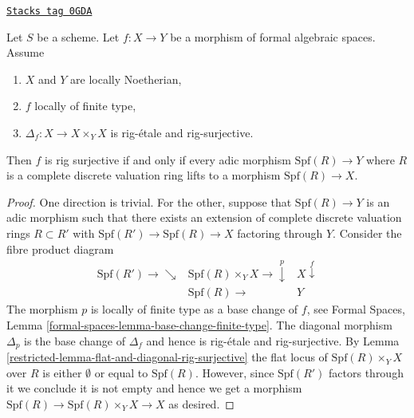 \begin{lemma}
\label{restricted-lemma-rig-monomorphism-rig-surjective}
\href{https://stacks.math.columbia.edu/tag/0GDA}{\texttt{Stacks tag 0GDA}}

Let $S$ be a scheme. Let $f : X \to Y$ be a morphism of formal algebraic
spaces. Assume
\begin{enumerate}
\item $X$ and $Y$ are locally Noetherian,
\item $f$ locally of finite type,
\item $\Delta_f : X \to X \times_Y X$ is rig-\'etale and rig-surjective.
\end{enumerate}
Then $f$ is rig surjective if and only if every adic morphism
$\text{Spf}(R) \to Y$ where $R$ is a complete discrete
valuation ring lifts to a morphism $\text{Spf}(R) \to X$.
\end{lemma}

\begin{proof}

One direction is trivial. For the other, suppose that $\text{Spf}(R) \to Y$
is an adic morphism such that there exists an extension of complete
discrete valuation rings $R \subset R'$ with
$\text{Spf}(R') \to \text{Spf}(R) \to X$ factoring through $Y$.
Consider the fibre product diagram
$$
\begin{array}{ccc}\text{Spf}(R') \longrightarrow\searrow & \text{Spf}(R) \times_Y X \longrightarrow\overset{p}{\downarrow} & X \overset{f}{\downarrow} \\  & \text{Spf}(R) \longrightarrow & Y\end{array}
$$
The morphism $p$ is locally of finite type as a base change of $f$, see
Formal Spaces, Lemma
\ref{formal-spaces-lemma-base-change-finite-type}.
The diagonal morphism $\Delta_p$ is the base change of
$\Delta_f$ and hence is rig-\'etale and rig-surjective.
By Lemma \ref{restricted-lemma-flat-and-diagonal-rig-surjective}
the flat locus of $\text{Spf}(R) \times_Y X$ over $R$
is either $\emptyset$ or equal to $\text{Spf}(R)$.
However, since $\text{Spf}(R')$ factors through it
we conclude it is not empty and hence
we get a morphism $\text{Spf}(R) \to \text{Spf}(R) \times_Y X \to X$
as desired.
\end{proof}

